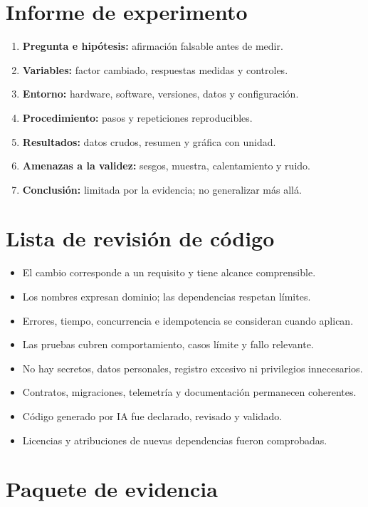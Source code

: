 \section{Informe de experimento}

\begin{enumerate}
  \item \textbf{Pregunta e hipótesis:} afirmación falsable antes de medir.
  \item \textbf{Variables:} factor cambiado, respuestas medidas y controles.
  \item \textbf{Entorno:} hardware, software, versiones, datos y configuración.
  \item \textbf{Procedimiento:} pasos y repeticiones reproducibles.
  \item \textbf{Resultados:} datos crudos, resumen y gráfica con unidad.
  \item \textbf{Amenazas a la validez:} sesgos, muestra, calentamiento y ruido.
  \item \textbf{Conclusión:} limitada por la evidencia; no generalizar más allá.
\end{enumerate}

\section{Lista de revisión de código}

\begin{itemize}
  \item El cambio corresponde a un requisito y tiene alcance comprensible.
  \item Los nombres expresan dominio; las dependencias respetan límites.
  \item Errores, tiempo, concurrencia e idempotencia se consideran cuando aplican.
  \item Las pruebas cubren comportamiento, casos límite y fallo relevante.
  \item No hay secretos, datos personales, registro excesivo ni privilegios innecesarios.
  \item Contratos, migraciones, telemetría y documentación permanecen coherentes.
  \item Código generado por IA fue declarado, revisado y validado.
  \item Licencias y atribuciones de nuevas dependencias fueron comprobadas.
\end{itemize}

\section{Paquete de evidencia}

